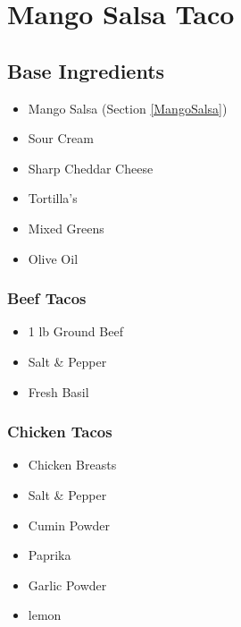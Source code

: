 \thispagestyle{fancy}
\section{Mango Salsa Taco}
\AddToShipoutPicture*{\MangoSalsaTaco}

\subsection*{Base Ingredients}
\begin{multicols}{3}
	\begin{itemize}
		\item Mango Salsa (Section \ref{MangoSalsa})
		\item Sour Cream
		\item Sharp Cheddar Cheese
		\item Tortilla's
		\item Mixed Greens
		\item Olive Oil
	\end{itemize}
\end{multicols}

\subsubsection*{Beef Tacos}
\begin{multicols}{3}
	\begin{itemize}
		\item 1 lb Ground Beef 
		\item Salt \& Pepper
		\item Fresh Basil
	\end{itemize}
\end{multicols}

\subsubsection*{Chicken Tacos}
\begin{multicols}{3}
	\begin{itemize}
		\item Chicken Breasts
		\item Salt \& Pepper
		\item Cumin Powder
		\item Paprika
		\item Garlic Powder
		\item lemon
	\end{itemize}
\end{multicols}

